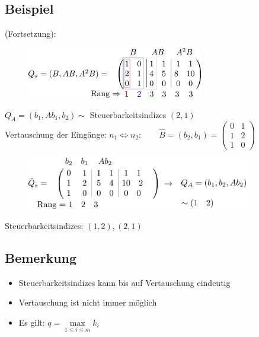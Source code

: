 \documentclass[ngerman]{tudscrreprt}
\begin{document}
\subsection*{Beispiel} (Fortsetzung):
\begin{figure}[H]
\centering
\def\svgwidth{200pt} 
  \includegraphics[width=7.7cm]{Zeichnung1.pdf}
\end{figure}

$Q_A = (b_1,Ab_1,b_2) \sim$ Steuerbarkeitsindizes $(2,1)$ \\ 
Vertauschung der Eingänge: $n_1 \iff n_2: \qquad \hat{B} = (b_2,b_1) = \begin{pmatrix} 0&1\\1&2\\1&0 \end{pmatrix}$  
\begin{figure}[H]
\centering
\def\svgwidth{200pt} 
  \includegraphics[width=9.7cm]{Zeichnung2.pdf}
\end{figure}
Steuerbarkeitsindizes: $(1,2), (2,1)$
\subsection*{Bemerkung}
\begin{itemize}
\item Steuerbarkeitsindizes kann bis auf Vertauschung eindeutig 
\item Vertauschung ist nicht immer möglich
\item Es gilt: $q = \max\limits_{1\le i\le m} k_i$
\end{itemize}
\end{document}
